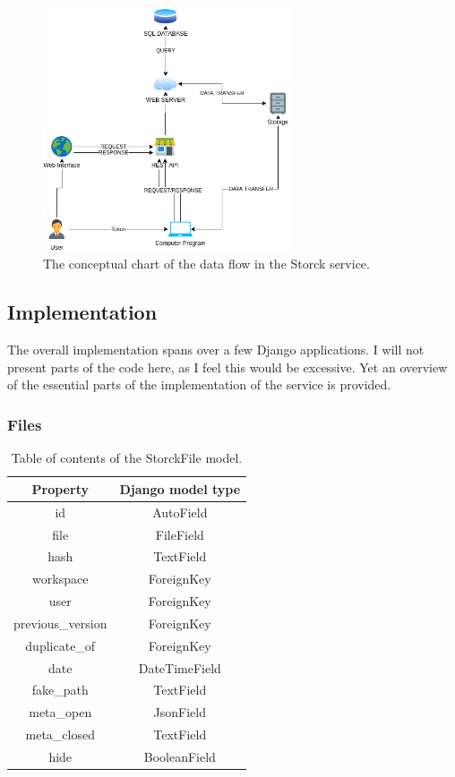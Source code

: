 \begin{figure}[H]
\centering
\includegraphics[width=0.65\textwidth]{figures/chapter5/storck/storck diagram.drawio.png}
\caption{The conceptual chart of the data flow in the Storck service.}
\label{fig:storck_diagram}
\end{figure}

\subsection{Implementation}

The overall implementation spans over a few Django applications. I will not present parts of the code here, as I feel this would be excessive.
Yet an overview of the essential parts of the implementation of the service is provided.

\subsubsection{Files}

\begin{table}[h]
\begin{center}
\begin{tabular}{ |c|c| }
\hline
Property & Django model type \\
\hline
id & AutoField \\
file & FileField \\
hash & TextField \\
workspace & ForeignKey \\
user & ForeignKey \\
previous\_version & ForeignKey \\
duplicate\_of & ForeignKey \\
date & DateTimeField \\
fake\_path & TextField \\
meta\_open & JsonField \\
meta\_closed & TextField \\
hide & BooleanField \\
\hline
\end{tabular}
\caption{\label{tab:storck_filesfield}Table of contents of the StorckFile model.}
\end{center}
\end{table}

